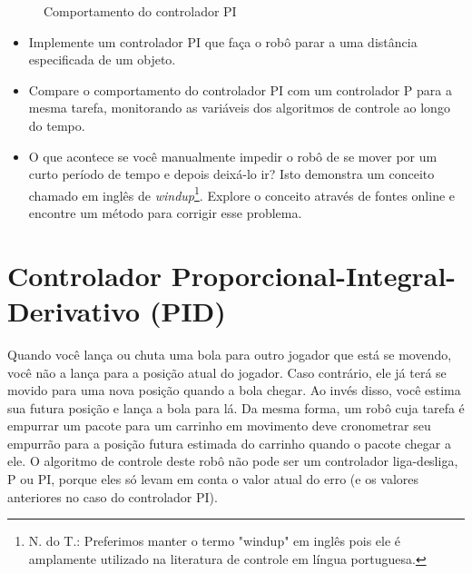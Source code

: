 \begin{figure}
\begin{center}
\caption{Comportamento do controlador PI}\label{fig.pi-control}
\end{center}
\end{figure}

\begin{framed}
\begin{itemize}
\item Implemente um controlador PI que faça o robô parar a uma distância especificada de um objeto.
\item Compare o comportamento do controlador PI com um controlador P para a mesma tarefa, monitorando as variáveis dos algoritmos de controle ao longo do tempo.
\item O que acontece se você manualmente impedir o robô de se mover por um curto período de tempo e depois deixá-lo ir? Isto demonstra um conceito chamado em inglês de \emph{windup}\footnote{N. do T.: Preferimos manter o termo "windup" em inglês pois ele é amplamente utilizado na literatura de controle em língua portuguesa.}. Explore o conceito através de fontes online e encontre um método para corrigir esse problema.
\end{itemize}
\end{framed}

\section{Controlador Proporcional-Integral-Derivativo (PID)}\label{s.pid}

Quando você lança ou chuta uma bola para outro jogador que está se movendo, você não a lança para a posição atual do jogador. Caso contrário, ele já terá se movido para uma nova posição quando a bola chegar. Ao invés disso, você estima sua futura posição e lança a bola para lá. Da mesma forma, um robô cuja tarefa é empurrar um pacote para um carrinho em movimento deve cronometrar seu empurrão para a posição futura estimada do carrinho quando o pacote chegar a ele. O algoritmo de controle deste robô não pode ser um controlador liga-desliga, P ou PI, porque eles só levam em conta o valor atual do erro (e os valores anteriores no caso do controlador PI). 

